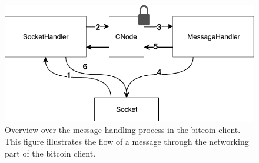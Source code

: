 \begin{figure}[!htb]
	\begin{center}
		\includegraphics{Figures/dataflow}
		\caption[Overview of the message handling process in the bitcoin client.]{\label{fig:dataflow} Overview over the message handling process in the bitcoin client. This figure illustrates the flow of a message through the networking part of the bitcoin client.}
	\end{center}
\end{figure}







